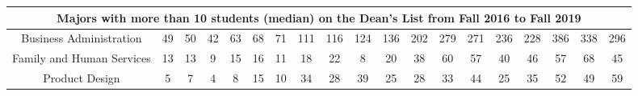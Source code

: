 \documentclass[10]{article}
\begin{document}
\begin{landscape}
\begin{longtable}[c]{|ccccccccccccccccccc|}
	\multicolumn{19}{|c|}{\textbf{Majors with more than 10 students (median) on the Dean's List from Fall 2016 to Fall 2019}}                                                                                                                                                                                                                                                                                                                                                                                                                                                                                                                                                       \\ \hline
	\multicolumn{1}{|c|}{Business Administration}                    & \multicolumn{1}{c|}{49}         & \multicolumn{1}{c|}{50}         & \multicolumn{1}{c|}{42}         & \multicolumn{1}{c|}{63}         & \multicolumn{1}{c|}{68}         & \multicolumn{1}{c|}{71}         & \multicolumn{1}{c|}{111}        & \multicolumn{1}{c|}{116}        & \multicolumn{1}{c|}{124}        & \multicolumn{1}{c|}{136}        & \multicolumn{1}{c|}{202}        & \multicolumn{1}{c|}{279}        & \multicolumn{1}{c|}{271}        & \multicolumn{1}{c|}{236}        & \multicolumn{1}{c|}{228}        & \multicolumn{1}{c|}{386}        & \multicolumn{1}{c|}{338}        & 296        \\ \hline
	\multicolumn{1}{|c|}{Family and Human Services}                  & \multicolumn{1}{c|}{13}         & \multicolumn{1}{c|}{13}         & \multicolumn{1}{c|}{9}          & \multicolumn{1}{c|}{15}         & \multicolumn{1}{c|}{16}         & \multicolumn{1}{c|}{11}         & \multicolumn{1}{c|}{18}         & \multicolumn{1}{c|}{22}         & \multicolumn{1}{c|}{8}          & \multicolumn{1}{c|}{20}         & \multicolumn{1}{c|}{38}         & \multicolumn{1}{c|}{60}         & \multicolumn{1}{c|}{57}         & \multicolumn{1}{c|}{40}         & \multicolumn{1}{c|}{46}         & \multicolumn{1}{c|}{57}         & \multicolumn{1}{c|}{68}         & 45         \\ \hline
	\multicolumn{1}{|c|}{Product Design}                             & \multicolumn{1}{c|}{5}          & \multicolumn{1}{c|}{7}          & \multicolumn{1}{c|}{4}          & \multicolumn{1}{c|}{8}          & \multicolumn{1}{c|}{15}         & \multicolumn{1}{c|}{10}         & \multicolumn{1}{c|}{34}         & \multicolumn{1}{c|}{28}         & \multicolumn{1}{c|}{39}         & \multicolumn{1}{c|}{25}         & \multicolumn{1}{c|}{28}         & \multicolumn{1}{c|}{33}         & \multicolumn{1}{c|}{44}         & \multicolumn{1}{c|}{25}         & \multicolumn{1}{c|}{35}         & \multicolumn{1}{c|}{52}         & \multicolumn{1}{c|}{49}         & 59         \\ \hline

\end{longtable}
\end{landscape}
\end{document}
